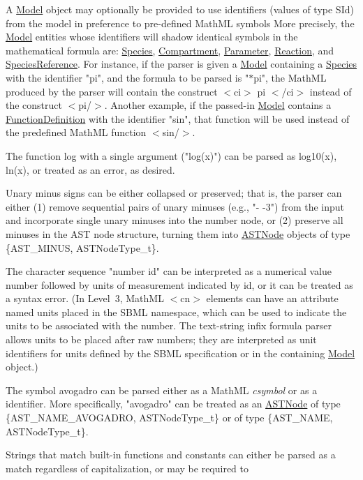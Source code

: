 \begin{DoxyItemize}
\item A \hyperlink{class_model}{Model} object may optionally be provided to use identifiers (values of type {\ttfamily S\+Id}) from the model in preference to pre-\/defined Math\+ML symbols More precisely, the \hyperlink{class_model}{Model} entities whose identifiers will shadow identical symbols in the mathematical formula are\+: \hyperlink{class_species}{Species}, \hyperlink{class_compartment}{Compartment}, \hyperlink{class_parameter}{Parameter}, \hyperlink{class_reaction}{Reaction}, and \hyperlink{class_species_reference}{Species\+Reference}. For instance, if the parser is given a \hyperlink{class_model}{Model} containing a \hyperlink{class_species}{Species} with the identifier "{\ttfamily pi}", and the formula to be parsed is "{$\ast$pi}", the Math\+ML produced by the parser will contain the construct {\ttfamily $<$ci$>$ pi $<$/ci$>$} instead of the construct {\ttfamily $<$pi/$>$}. Another example, if the passed-\/in \hyperlink{class_model}{Model} contains a \hyperlink{class_function_definition}{Function\+Definition} with the identifier "{\ttfamily sin}", that function will be used instead of the predefined Math\+ML function {\ttfamily $<$sin/$>$}. \item The function {\ttfamily log} with a single argument ("{\ttfamily log(x)}") can be parsed as {\ttfamily log10(x)}, {\ttfamily ln(x)}, or treated as an error, as desired. \item Unary minus signs can be either collapsed or preserved; that is, the parser can either (1) remove sequential pairs of unary minuses (e.\+g., "{\ttfamily -\/ -\/3}") from the input and incorporate single unary minuses into the number node, or (2) preserve all minuses in the A\+ST node structure, turning them into \hyperlink{class_a_s_t_node}{A\+S\+T\+Node} objects of type \{A\+S\+T\+\_\+\+M\+I\+N\+US, A\+S\+T\+Node\+Type\+\_\+t\}. \item The character sequence "{\ttfamily number id}" can be interpreted as a numerical value {\ttfamily number} followed by units of measurement indicated by {\ttfamily id}, or it can be treated as a syntax error. (In Level~3, Math\+ML {\ttfamily $<$cn$>$} elements can have an attribute named {\ttfamily units} placed in the S\+B\+ML namespace, which can be used to indicate the units to be associated with the number. The text-\/string infix formula parser allows units to be placed after raw numbers; they are interpreted as unit identifiers for units defined by the S\+B\+ML specification or in the containing \hyperlink{class_model}{Model} object.) \item The symbol {\ttfamily avogadro} can be parsed either as a Math\+ML {\itshape csymbol} or as a identifier. More specifically, "{\ttfamily avogadro}" can be treated as an \hyperlink{class_a_s_t_node}{A\+S\+T\+Node} of type \{A\+S\+T\+\_\+\+N\+A\+M\+E\+\_\+\+A\+V\+O\+G\+A\+D\+RO, A\+S\+T\+Node\+Type\+\_\+t\} or of type \{A\+S\+T\+\_\+\+N\+A\+ME, A\+S\+T\+Node\+Type\+\_\+t\}. \item Strings that match built-\/in functions and constants can either be parsed as a match regardless of capitalization, or may be required to 
\end{DoxyItemize}
